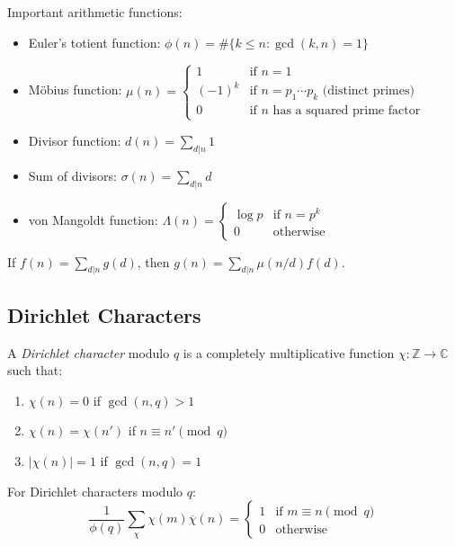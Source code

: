 Important arithmetic functions:
\begin{itemize}
\item Euler's totient function: $\phi(n) = \#\{k \leq n : \gcd(k,n) = 1\}$
\item Möbius function: $\mu(n) = \begin{cases}
1 & \text{if } n = 1 \\
(-1)^k & \text{if } n = p_1 \cdots p_k \text{ (distinct primes)} \\
0 & \text{if } n \text{ has a squared prime factor}
\end{cases}$
\item Divisor function: $d(n) = \sum_{d|n} 1$
\item Sum of divisors: $\sigma(n) = \sum_{d|n} d$
\item von Mangoldt function: $\Lambda(n) = \begin{cases}
\log p & \text{if } n = p^k \\
0 & \text{otherwise}
\end{cases}$
\end{itemize}

\begin{theorem}
If $f(n) = \sum_{d|n} g(d)$, then $g(n) = \sum_{d|n} \mu(n/d) f(d)$.
\end{theorem}

\subsection{Dirichlet Characters}

\begin{definition}
A \emph{Dirichlet character} modulo $q$ is a completely multiplicative function $\chi: \mathbb{Z} \to \mathbb{C}$ such that:
\begin{enumerate}
\item $\chi(n) = 0$ if $\gcd(n,q) > 1$
\item $\chi(n) = \chi(n')$ if $n \equiv n' \pmod{q}$
\item $|\chi(n)| = 1$ if $\gcd(n,q) = 1$
\end{enumerate}
\end{definition}

\begin{theorem}
For Dirichlet characters modulo $q$:
\[
\frac{1}{\phi(q)} \sum_{\chi} \chi(m) \overline{\chi}(n) = \begin{cases}
1 & \text{if } m \equiv n \pmod{q} \\
0 & \text{otherwise}
\end{cases}
\]
\end{theorem}


